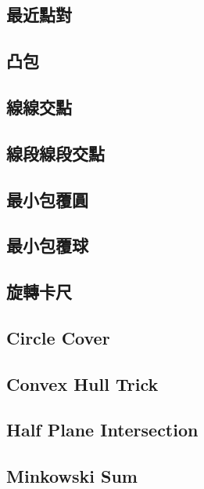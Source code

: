 \documentclass[a4paper,10pt,twocolumn,oneside]{article}
\begin{document}
\subsection{最近點對}

\subsection{凸包}

\subsection{線線交點}

\subsection{線段線段交點}

%
\subsection{最小包覆圓}

\subsection{最小包覆球}

\subsection{旋轉卡尺}

\subsection{Circle Cover }

\subsection{Convex Hull Trick}

\subsection{Half Plane Intersection}

\subsection{Minkowski Sum}

\end{document}

